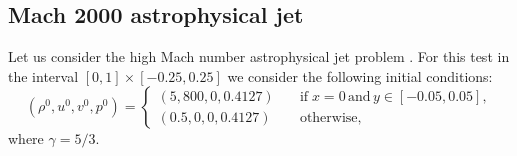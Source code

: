 \subsection{Mach 2000 astrophysical jet}\label{ssec:Mach}
Let us consider the high Mach number astrophysical jet problem \cite{HaShu,ZhangShu2010}. 
For this test in the interval $[0,1]\times[-0.25,0.25]$ we consider the following initial conditions:
\begin{equation}
\label{IC:Mach2000}
    (\rho^0,u^0,v^0,p^0) = \left\{ \begin{array}{ll}
        (5,800,0,0.4127) & \quad \text{if} \; x=0 \, \text{and} \, y\in [-0.05,0.05], \\ 
        (0.5,0,0,0.4127) & \quad \text{otherwise},
    \end{array} \right.
\end{equation} 
where $\gamma = 5/3$.

